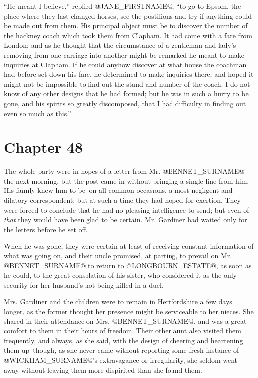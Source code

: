 ``He meant I believe,'' replied @JANE_FIRSTNAME@, ``to go to Epsom, the place where
they last changed horses, see the postilions and try if anything could
be made out from them. His principal object must be to discover the
number of the hackney coach which took them from Clapham. It had come
with a fare from London; and as he thought that the circumstance of a
gentleman and lady's removing from one carriage into another might
be remarked he meant to make inquiries at Clapham. If he could anyhow
discover at what house the coachman had before set down his fare, he
determined to make inquiries there, and hoped it might not be impossible
to find out the stand and number of the coach. I do not know of any
other designs that he had formed; but he was in such a hurry to be gone,
and his spirits so greatly discomposed, that I had difficulty in finding
out even so much as this.''



\chapter*{Chapter 48}


The whole party were in hopes of a letter from Mr. @BENNET_SURNAME@ the next
morning, but the post came in without bringing a single line from him.
His family knew him to be, on all common occasions, a most negligent and
dilatory correspondent; but at such a time they had hoped for exertion.
They were forced to conclude that he had no pleasing intelligence to
send; but even of \textit{that} they would have been glad to be certain. Mr.
Gardiner had waited only for the letters before he set off.

When he was gone, they were certain at least of receiving constant
information of what was going on, and their uncle promised, at parting,
to prevail on Mr. @BENNET_SURNAME@ to return to @LONGBOURN_ESTATE@, as soon as he could,
to the great consolation of his sister, who considered it as the only
security for her husband's not being killed in a duel.

Mrs. Gardiner and the children were to remain in Hertfordshire a few
days longer, as the former thought her presence might be serviceable
to her nieces. She shared in their attendance on Mrs. @BENNET_SURNAME@, and was a
great comfort to them in their hours of freedom. Their other aunt also
visited them frequently, and always, as she said, with the design of
cheering and heartening them up--though, as she never came without
reporting some fresh instance of @WICKHAM_SURNAME@'s extravagance or irregularity,
she seldom went away without leaving them more dispirited than she found
them.

